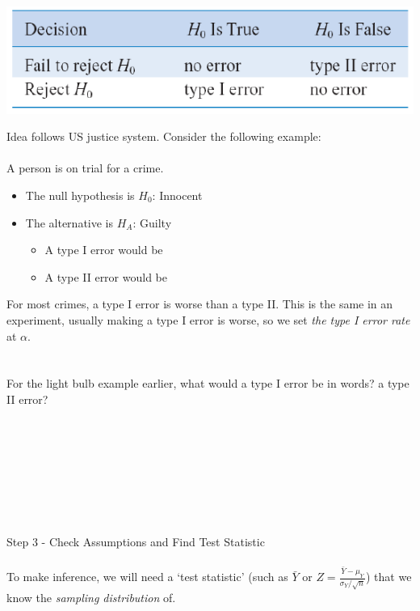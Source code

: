 \begin{center}
\includegraphics[scale=0.5]{testing}
\end{center}

\newpage

Idea follows US justice system.  Consider the following example:\\~\\
A person is on trial for a crime.	
\begin{itemize}
\item The null hypothesis is $H_0$: Innocent  
\item The alternative is $H_A$: Guilty
\begin{itemize}
\item A type I error would be \\
\item A type II error would be \\
\end{itemize}
\end{itemize}
For most crimes, a type I error is worse than a type II.  This is the same in an experiment, usually making a type I error is worse, so we set \textit{the type I error rate} at $\alpha$.\\~\\~\\

For the light bulb example earlier, what would a type I error be in words?  a type II error?\\~\\~\\~\\~\\~\\~\\~\\~\\

\large Step 3 - Check Assumptions and Find Test Statistic\normalsize\\~\\
To make inference, we will need a `test statistic' (such as $\bar{Y}$ or $Z=\frac{\bar{Y}-\mu_Y}{\sigma_Y/\sqrt{n}}$) that we know the \textit{sampling distribution} of.\\~\\

